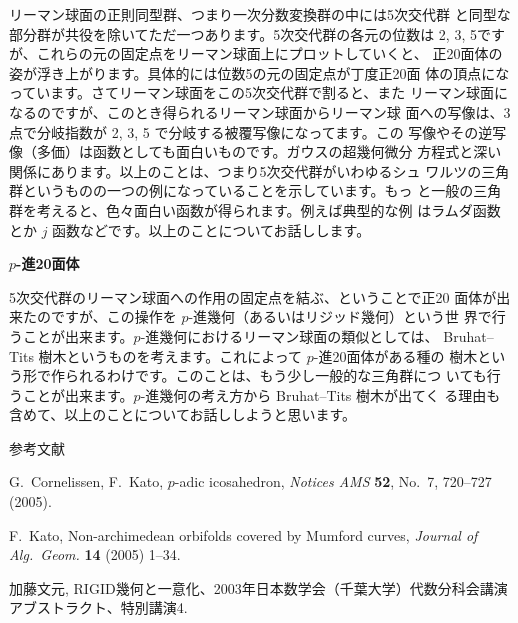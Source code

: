\documentclass[uplatex,dvipdfmx]{jlreq}
\begin{document}
リーマン球面の正則同型群、つまり一次分数変換群の中には5次交代群
と同型な部分群が共役を除いてただ一つあります。5次交代群の各元の位数は
2, 3, 5ですが、これらの元の固定点をリーマン球面上にプロットしていくと、
正20面体の姿が浮き上がります。具体的には位数5の元の固定点が丁度正20面
体の頂点になっています。さてリーマン球面をこの5次交代群で割ると、また
リーマン球面になるのですが、このとき得られるリーマン球面からリーマン球
面への写像は、3点で分岐指数が 2, 3, 5 で分岐する被覆写像になってます。この
写像やその逆写像（多価）は函数としても面白いものです。ガウスの超幾何微分
方程式と深い関係にあります。以上のことは、つまり5次交代群がいわゆるシュ
ワルツの三角群というものの一つの例になっていることを示しています。もっ
と一般の三角群を考えると、色々面白い函数が得られます。例えば典型的な例
はラムダ函数とか $j$ 函数などです。以上のことについてお話しします。

\vfill

\newpage

\begin{center}
{\large\bfseries $p$-進20面体}\\[6pt]
\hspace*{\fill}{\large\bfseries 加藤 文元（京大・理）}
\end{center}

5次交代群のリーマン球面への作用の固定点を結ぶ、ということで正20
面体が出来たのですが、この操作を $p$-進幾何（あるいはリジッド幾何）という世
界で行うことが出来ます。$p$-進幾何におけるリーマン球面の類似としては、
Bruhat--Tits 樹木というものを考えます。これによって $p$-進20面体がある種の
樹木という形で作られるわけです。このことは、もう少し一般的な三角群につ
いても行うことが出来ます。$p$-進幾何の考え方から Bruhat--Tits 樹木が出てく
る理由も含めて、以上のことについてお話ししようと思います。

\vfill

\begin{center}\textsc{参考文献}\end{center}
\begin{enumerate}[{[1]}]
  \item G.~Cornelissen, F.~Kato,
    $p$-adic icosahedron,
    \textit{Notices AMS} \textbf{52}, No.~7, 720--727 (2005).
  \item F.~Kato,
    Non-archimedean orbifolds covered by Mumford curves,
    \textit{Journal of Alg.\ Geom.} \textbf{14} (2005) 1--34.
  \item 加藤文元, RIGID幾何と一意化、2003年日本数学会（千葉大学）代数分科会講演アブストラクト、特別講演4.
\end{enumerate}
\end{document}

